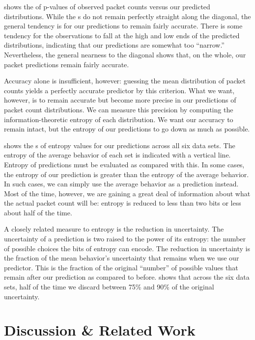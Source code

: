 \documentclass{acm_proc_article-sp}
\begin{document}
 shows the  of p-values of observed packet counts versus our predicted distributions.
While the s do not remain perfectly straight along the diagonal, the general tendency is for our predictions to remain fairly accurate.
There is some tendency for the observations to fall at the high and low ends of the predicted distributions, indicating that our predictions are somewhat too ``narrow.''
Nevertheless, the general nearness to the diagonal shows that, on the whole, our packet predictions remain fairly accurate.

Accuracy alone is insufficient, however:
guessing the mean distribution of packet counts yields a perfectly accurate predictor by this criterion.
What we want, however, is to remain accurate but become more precise in our predictions of packet count distributions.
We can measure this precision by computing the information-theoretic entropy of each distribution.
We want our accuracy to remain intact, but the entropy of our predictions to go down as much as possible.

 shows the s of entropy values for our predictions across all six data sets.
The entropy of the average behavior of each set is indicated with a vertical line.
Entropy of predictions must be evaluated as compared with this.
In some cases, the entropy of our prediction is greater than the entropy of the average behavior.
In such cases, we can simply use the average behavior as a prediction instead.
Most of the time, however, we are gaining a great deal of information about what the actual packet count will be:
entropy is reduced to less than two bits or less about half of the time.

A closely related measure to entropy is the reduction in uncertainty.
The uncertainty of a prediction is two raised to the power of its entropy:
the number of possible choices the bits of entropy can encode.
The reduction in uncertainty is the fraction of the mean behavior's uncertainty that remains when we use our predictor.
This is the fraction of the original ``number'' of possible values that remain after our prediction as compared to before.
 shows that across the six data sets, half of the time we discard between 75\% and 90\% of the original uncertainty.

\section{Discussion \& Related Work}
\end{document}
